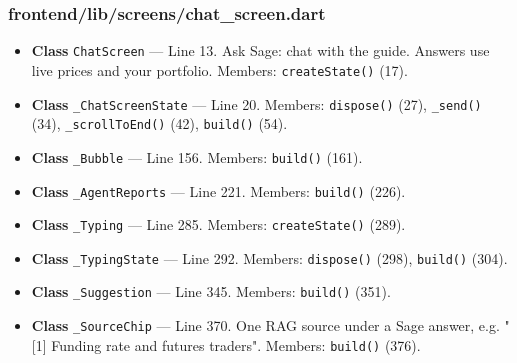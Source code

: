 \subsubsection*{frontend/lib/screens/chat\_screen.dart}
\begin{itemize}[nosep,leftmargin=1.5em]
\item \textbf{Class} \texttt{ChatScreen} --- Line 13. Ask Sage: chat with the guide. Answers use live prices and your portfolio. Members: \texttt{createState(\allowbreak{})} (17).
\item \textbf{Class} \texttt{\_\allowbreak{}ChatScreenState} --- Line 20. Members: \texttt{dispose(\allowbreak{})} (27), \texttt{\_\allowbreak{}send(\allowbreak{})} (34), \texttt{\_\allowbreak{}scrollToEnd(\allowbreak{})} (42), \texttt{build(\allowbreak{})} (54).
\item \textbf{Class} \texttt{\_\allowbreak{}Bubble} --- Line 156. Members: \texttt{build(\allowbreak{})} (161).
\item \textbf{Class} \texttt{\_\allowbreak{}AgentReports} --- Line 221. Members: \texttt{build(\allowbreak{})} (226).
\item \textbf{Class} \texttt{\_\allowbreak{}Typing} --- Line 285. Members: \texttt{createState(\allowbreak{})} (289).
\item \textbf{Class} \texttt{\_\allowbreak{}TypingState} --- Line 292. Members: \texttt{dispose(\allowbreak{})} (298), \texttt{build(\allowbreak{})} (304).
\item \textbf{Class} \texttt{\_\allowbreak{}Suggestion} --- Line 345. Members: \texttt{build(\allowbreak{})} (351).
\item \textbf{Class} \texttt{\_\allowbreak{}SourceChip} --- Line 370. One RAG source under a Sage answer, e.g. "[1] Funding rate and futures traders". Members: \texttt{build(\allowbreak{})} (376).
\end{itemize}
